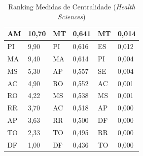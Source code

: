 \begin{table}[H]
\begin{tabular}{|l|l|l|l|l|l|}
		AM                          & 10,70                         & MT                                  & 0,641                                  & MT                                  & 0,014                                  \\ \hline
		PI                          & 9,90                          & PI                                  & 0,616                                  & ES                                  & 0,012                                  \\ \hline
		MA                          & 9,40                          & MA                                  & 0,614                                  & PI                                  & 0,004                                  \\ \hline
		MS                          & 5,30                          & AP                                  & 0,557                                  & SE                                  & 0,004                                  \\ \hline
		AC                          & 4,90                          & RO                                  & 0,552                                  & AC                                  & 0,001                                  \\ \hline
		RO                          & 4,22                          & MS                                  & 0,538                                  & MS                                  & 0,001                                  \\ \hline
		RR                          & 3,70                          & AC                                  & 0,518                                  & AP                                  & 0,000                                  \\ \hline
		AP                          & 3,63                          & RR                                  & 0,500                                  & DF                                  & 0,000                                  \\ \hline
		TO                          & 2,33                          & TO                                  & 0,495                                  & RR                                  & 0,000                                  \\ \hline
		DF                          & 1,00                          & DF                                  & 0,436                                  & TO                                  & 0,000                                  \\ \hline
	\end{tabular}
	\caption{Ranking Medidas de Centralidade (\textit{Health Sciences})}
	\label{rank-health}
\end{table}

